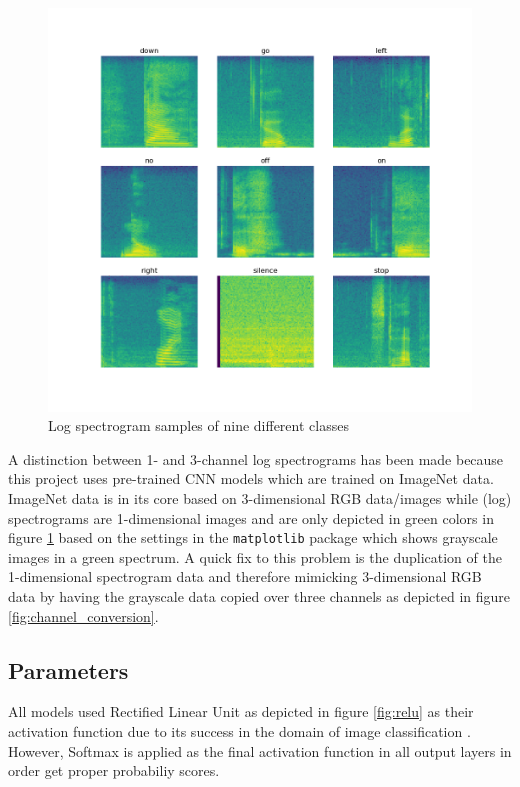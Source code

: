 \documentclass{article}
\theoremstyle{definition}
\theoremstyle{remark}
\begin{document}
\begin{figure}[h!]
    \centering
    \includegraphics[width=1\textwidth]{img/9_log_spectrograms.png}
    \caption{Log spectrogram samples of nine different classes}
    \label{fig:log_spectrograms}
\end{figure}

A distinction between 1- and 3-channel log spectrograms has been made because this project uses pre-trained CNN models which are trained on ImageNet data. ImageNet data is in its core based on 3-dimensional RGB data/images while (log) spectrograms are 1-dimensional images and are only depicted in green colors in figure \ref{fig:log_spectrograms} based on the settings in the \texttt{matplotlib} package which shows grayscale images in a green spectrum. A quick fix to this problem is the duplication of the 1-dimensional spectrogram data and therefore mimicking 3-dimensional RGB data by having the grayscale data copied over three channels as depicted in figure \ref{fig:channel_conversion}.


\subsection{Parameters}


All models used Rectified Linear Unit as depicted in figure \ref{fig:relu} as their activation function due to its success in the domain of image classification \cite{dahl2013improving}. However, Softmax is applied as the final activation function in all output layers in order get proper probabiliy scores.
\end{document}
